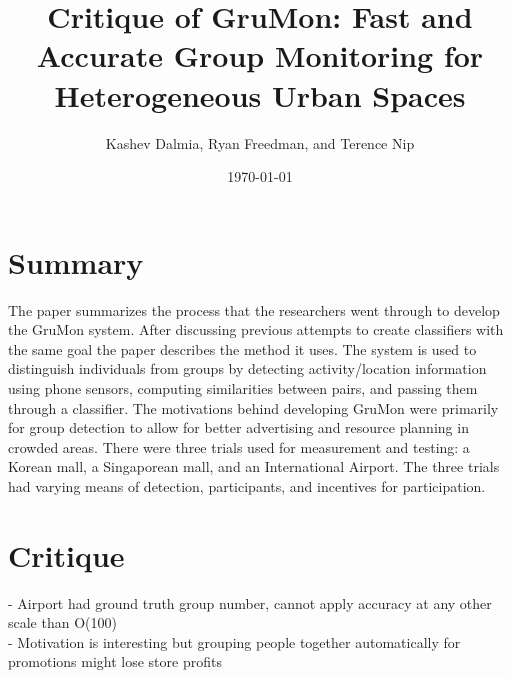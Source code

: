 \documentclass[12pt]{amsart}
\title{Critique of GruMon: Fast and Accurate Group Monitoring for Heterogeneous Urban Spaces}
\author[]{Kashev Dalmia, Ryan Freedman, and Terence Nip}
\affil[]{University of Illinois at Urbana-Champaign}
\date{\today}
\begin{document}
\maketitle

\section{\bf Summary}
The paper summarizes the process that the researchers went through to develop the GruMon system. After discussing previous attempts to create classifiers with the same goal the paper describes the method it uses. The system is used to distinguish individuals from groups by detecting activity/location information using phone sensors, computing similarities between pairs, and passing them through a classifier. The motivations behind developing GruMon were primarily for group detection to allow for better advertising and resource planning in crowded areas. There were three trials used for measurement and testing: a Korean mall, a Singaporean mall, and an International Airport. The three trials had varying means of detection, participants, and incentives for participation.

\section{\bf Critique}
\begin{center}
- Airport had ground truth group number, cannot apply accuracy at any other scale than O(100) \\
- Motivation is interesting but grouping people together automatically for promotions might lose store profits
\end{center}
\end{document}
